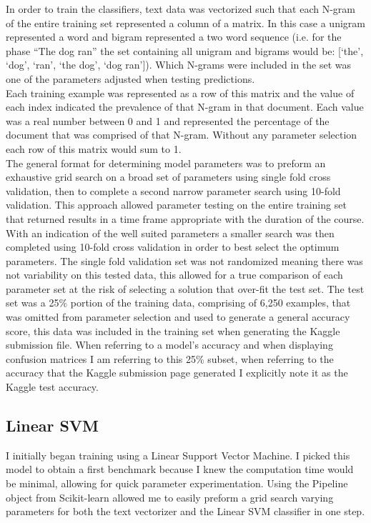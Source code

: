 \documentclass[11pt]{article}
\begin{document}
In order to train the classifiers, text data was vectorized such that each N-gram of the entire training set represented a column of a matrix. In this case a unigram represented a word and bigram represented a two word sequence (i.e. for the phase ``The dog ran'' the set containing all unigram and bigrams would be: [`the', `dog', `ran', `the dog', `dog ran']). Which N-grams were included in the set was one of the parameters adjusted when testing predictions.\\

Each training example was represented as a row of this matrix and the value of each index indicated the prevalence of that N-gram in that document. Each value was a real number between 0 and 1 and represented the percentage of the document that was comprised of that N-gram. Without any parameter selection each row of this matrix would sum to 1.\\

The general format for determining model parameters was to preform an exhaustive grid search on a broad set of parameters using single fold cross validation, then to complete a second narrow parameter search using 10-fold validation. This approach allowed parameter testing on the entire training set that returned results in a time frame appropriate with the duration of the course. With an indication of the well suited parameters a smaller search was then completed using 10-fold cross validation in order to best select the optimum parameters. The single fold validation set was not randomized meaning there was not variability on this tested data, this allowed for a true comparison of each parameter set at the risk of selecting a solution that over-fit the test set. The test set was a 25\% portion of the training data, comprising of 6,250 examples, that was omitted from parameter selection and used to generate a general accuracy score, this data was included in the training set when generating the Kaggle submission file. When referring to a model's accuracy and when displaying confusion matrices I am referring to this 25\% subset, when referring to the accuracy that the Kaggle submission page generated I explicitly note it as the Kaggle test accuracy.

\subsection{Linear SVM} \label{linsvm}
I initially began training using a Linear Support Vector Machine. I picked this model to obtain a first benchmark because I knew the computation time would be minimal, allowing for quick parameter experimentation. Using the Pipeline\cite{Pipeline} object from Scikit-learn allowed me to easily preform a grid search varying parameters for both the text vectorizer and the Linear SVM classifier in one step.\\
\end{document}
